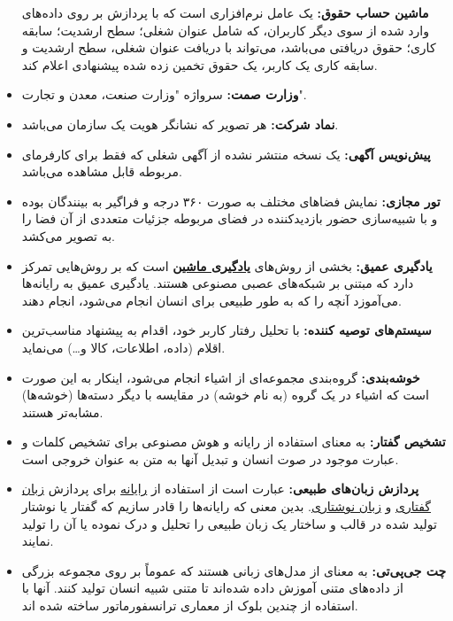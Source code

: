 \documentclass[12pt]{article}
\begin{document}
\begin{itemize}
		\textbf{ماشین حساب حقوق:}
		یک عامل نرم‌افزاری است که با پردازش بر روی داده‌های وارد شده از سوی دیگر کاربران، که شامل عنوان شغلی؛ سطح ارشدیت؛ سابقه کاری؛ حقوق دریافتی می‌باشد، می‌تواند با دریافت عنوان شغلی، سطح ارشدیت و سابقه کاری یک کاربر، یک حقوق تخمین زده شده پیشنهادی اعلام کند.
		\item
		\textbf{وزارت صمت:}
		سرواژه "وزارت صنعت، معدن و تجارت".
		\item
		\textbf{نماد شرکت:}
		هر تصویر که نشانگر هویت یک سازمان می‌باشد.
		\item
		\textbf{پیش‌نویس آگهی:}
		یک نسخه منتشر نشده از آگهی شغلی که فقط برای کارفرمای مربوطه قابل مشاهده می‌باشد.
		\item
		\textbf{تور مجازی:‌}
		نمایش فضاهای مختلف به صورت ۳۶۰ درجه و فراگیر به بینندگان بوده و با شبیه‌سازی حضور بازدیدکننده در فضای مربوطه جزئیات متعددی از آن فضا را به تصویر می‌کشد.
		\item
		\textbf{یادگیری عمیق:}
		بخشی از روش‌های \textbf{\hyperref[ref:ml]{یادگیری ماشین}} است که بر روش‌هایی تمرکز دارد که مبتنی بر شبکه‌های عصبی مصنوعی هستند. یادگیری عمیق به رایانه‌ها می‌آموزد آنچه را که به طور طبیعی برای انسان انجام می‌شود، انجام دهند.
		\item
		\textbf{سیستم‌های توصیه کننده:}
		با تحلیل رفتار کاربر خود، اقدام به پیشنهاد مناسب‌ترین اقلام (داده، اطلاعات، کالا و…) می‌نماید.
		\item
		\textbf{خوشه‌بندی:}
		گروه‌بندی مجموعه‌ای از اشیاء انجام می‌شود، اینکار به این صورت است که اشیاء در یک گروه (به نام خوشه) در مقایسه با دیگر دسته‌ها (خوشه‌ها) مشابه‌تر هستند.
		\item
		\textbf{تشخیص گفتار:}
		به معنای استفاده از رایانه و هوش مصنوعی برای تشخیص کلمات و عبارت موجود در صوت انسان و تبدیل آنها به متن به عنوان خروجی است.
		\item
		\textbf{پردازش زبان‌های طبیعی:}
		عبارت است از استفاده از
		\href{https://fa.wikipedia.org/wiki/%D8%B1%D8%A7%DB%8C%D8%A7%D9%86%D9%87}{رایانه}
		برای پردازش
		\href{https://fa.wikipedia.org/wiki/%D8%B2%D8%A8%D8%A7%D9%86_%DA%AF%D9%81%D8%AA%D8%A7%D8%B1%DB%8C}{زبان گفتاری}
		و
		\href{https://fa.wikipedia.org/wiki/%D8%B2%D8%A8%D8%A7%D9%86_%D9%86%D9%88%D8%B4%D8%AA%D8%A7%D8%B1%DB%8C}{زبان نوشتاری}. بدین معنی که رایانه‌ها را قادر سازیم که گفتار یا نوشتار تولید شده در قالب و ساختار یک زبان طبیعی را تحلیل و درک نموده یا آن را تولید نمایند.
		\item
		\textbf{چت جی‌پی‌تی:}
		به معنای
		از مدل‌های زبانی هستند که عموماً بر روی مجموعه بزرگی از داده‌های متنی آموزش داده شده‌اند تا متنی شبیه انسان تولید کنند. آنها با استفاده از چندین بلوک از معماری ترانسفورماتور ساخته شده اند.
	\end{itemize}
\end{document}
